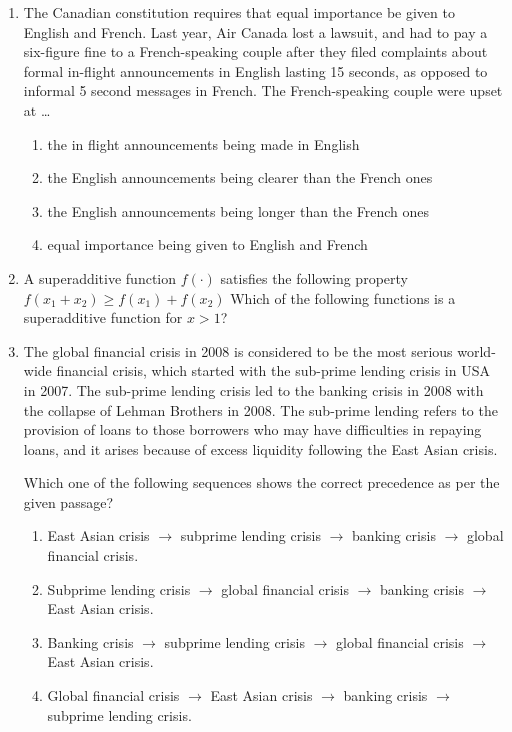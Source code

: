 \documentclass[journal,12pt,onecolumn]{IEEEtran}
\theoremstyle{remark}
\begin{document}
\begin{enumerate}
\item The Canadian constitution requires that equal importance be given to English and French. Last year, Air Canada lost a lawsuit, and had to pay a six-figure fine to a French-speaking couple after they filed complaints about formal in-flight announcements in English lasting 15 seconds, as opposed to informal 5 second messages in French.  
The French-speaking couple were upset at \dots
\begin{enumerate}
\item the in flight announcements being made in English
\item the English announcements being clearer than the French ones
\item the English announcements being longer than the French ones
\item equal importance being given to English and French
\end{enumerate}

\item A superadditive function $f(\cdot)$ satisfies the following property
$
    f(x_1 + x_2) \geq f(x_1) + f(x_2)
$
Which of the following functions is a superadditive function for $x > 1$?
\begin{enumerate}
\end{enumerate}

\item The global financial crisis in 2008 is considered to be the most serious world-wide financial crisis, which started with the sub-prime lending crisis in USA in 2007. The sub-prime lending crisis led to the banking crisis in 2008 with the collapse of Lehman Brothers in 2008. The sub-prime lending refers to the provision of loans to those borrowers who may have difficulties in repaying loans, and it arises because of excess liquidity following the East Asian crisis.

Which one of the following sequences shows the correct precedence as per the given passage?
\begin{enumerate}
    \item East Asian crisis $\rightarrow$ subprime lending crisis $\rightarrow$ banking crisis $\rightarrow$ global financial crisis.
    \item Subprime lending crisis $\rightarrow$ global financial crisis $\rightarrow$ banking crisis $\rightarrow$ East Asian crisis.
    \item Banking crisis $\rightarrow$ subprime lending crisis $\rightarrow$ global financial crisis $\rightarrow$ East Asian crisis.
    \item Global financial crisis $\rightarrow$ East Asian crisis $\rightarrow$ banking crisis $\rightarrow$ subprime lending crisis.
\end{enumerate}


\end{enumerate}
\end{document}
